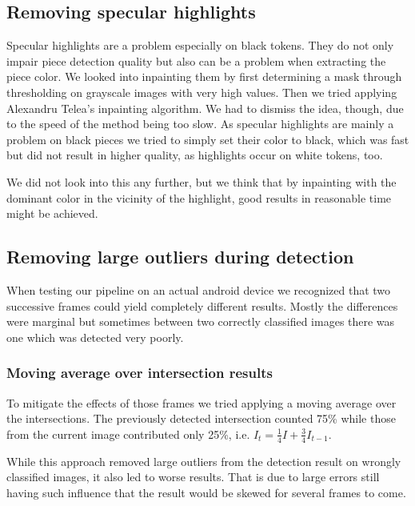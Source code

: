 	\subsection{Removing specular highlights}
	\label{evaluation-prepostprocessing-specularHighlights}
	Specular highlights are a problem especially on black tokens. They do not only impair piece detection quality but also can be a problem when extracting the piece color. We looked into inpainting them by first determining a mask through thresholding on grayscale images with very high values. Then we tried applying Alexandru Telea's inpainting algorithm\cite{telea2004image}. We had to dismiss the idea, though, due to the speed of the method being too slow. As specular highlights are mainly a problem on black pieces we tried to simply set their color to black, which was fast but did not result in higher quality, as highlights occur on white tokens, too.

	We did not look into this any further, but we think that by inpainting with the dominant color in the vicinity of the highlight, good results in reasonable time might be achieved.

	\subsection{Removing large outliers during detection}
	\label{evaluation-prepostprocessing-filteringOutliers}
	When testing our pipeline on an actual android device we recognized that two successive frames could yield completely different results. Mostly the differences were marginal but sometimes between two correctly classified images there was one which was detected very poorly.

	\subsubsection{Moving average over intersection results}
	\label{evaluation-prepostprocessing-filteringOutliers-movingAverage}
	To mitigate the effects of those frames we tried applying a moving average over the intersections. The previously detected intersection counted 75\% while those from the current image contributed only 25\%, i.e. $I_t = \frac{1}{4}I + \frac{3}{4}I_{t-1}$.

	While this approach removed large outliers from the detection result on wrongly classified images, it also led to worse results. That is due to large errors still having such influence that the result would be skewed for several frames to come.

